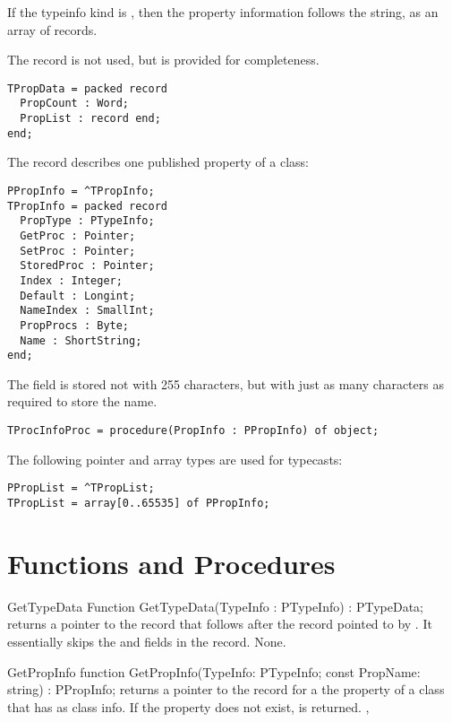 If the typeinfo kind is , then the property 
information follows the  string, as an array of  records.

The  record is not used, but is provided for completeness.
\begin{verbatim}
TPropData = packed record
  PropCount : Word;
  PropList : record end;
end;
\end{verbatim}
The  record describes one published property of a class:
\begin{verbatim}
PPropInfo = ^TPropInfo;
TPropInfo = packed record
  PropType : PTypeInfo;
  GetProc : Pointer;
  SetProc : Pointer;
  StoredProc : Pointer;
  Index : Integer;
  Default : Longint;
  NameIndex : SmallInt;
  PropProcs : Byte;
  Name : ShortString;
end;
\end{verbatim}
The  field is stored not with 255 characters, but with just as many characters
as required to store the name.
\begin{verbatim}
TProcInfoProc = procedure(PropInfo : PPropInfo) of object;
\end{verbatim}
The following pointer and array types are used for typecasts:
\begin{verbatim}
PPropList = ^TPropList;
TPropList = array[0..65535] of PPropInfo;
\end{verbatim}

\section{Functions and Procedures}

\begin{function}{GetTypeData}
\Declaration
Function GetTypeData(TypeInfo : PTypeInfo) : PTypeData;
\Description
{} returns a pointer to the  record that
follows after the  record pointed to by .
It essentially skips the  and  fields in the 
 record.
\Errors
None.
\SeeAlso
\end{function}


\begin{function}{GetPropInfo}
\Declaration
function GetPropInfo(TypeInfo: PTypeInfo; 
                     const PropName: string) : PPropInfo;
\Description
{} returns a pointer to the  record for a the 
property of a class that has  as class info. 
\Errors
If the property  does not exist,  is returned.
\SeeAlso
{},
\end{function}


